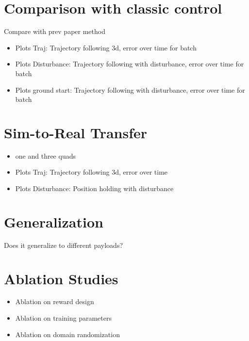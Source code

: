 \section{Comparison with classic control}
Compare with prev paper method \autocite{Wahba2024}
\begin{itemize}
    \item Plots Traj: Trajectory following 3d, error over time for batch
    \item Plots Disturbance: Trajectory following with disturbance, error over time for batch
    \item Plots ground start: Trajectory following with disturbance, error over time for batch
\end{itemize} 
\section{Sim-to-Real Transfer}
\begin{itemize}
    \item one and three quads
    \item Plots Traj: Trajectory following 3d,  error over time 
    \item Plots Disturbance: Position holding with disturbance
\end{itemize}

\section{Generalization}
Does it generalize to different payloads?

\section{Ablation Studies}
\begin{itemize}
    \item Ablation on reward design
    \item Ablation on training parameters
    \item Ablation on domain randomization
    
\end{itemize}